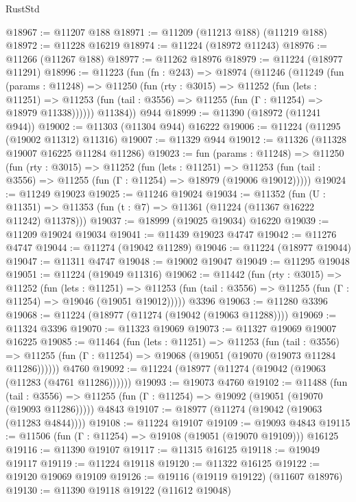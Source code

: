 \begin{lexlean}{RustStd}
\begin{coremodule}
@18967 := @11207 @188
@18971 := @11209 (@11213 @188) (@11219 @188)
@18972 := @11228 @16219
@18974 := @11224 (@18972 @11243)
@18976 := @11266 (@11267 @188)
@18977 := @11262 @18976
@18979 := @11224 (@18977 @11291)
@18996 := @11223
    (fun (fn : @243) =>
    @18974
      (@11246
        (@11249
          (fun (params : @11248) =>
          @11250
            (fun (rty : @3015) =>
            @11252
              (fun (lets : @11251) =>
              @11253 (fun (tail : @3556) => @11255 (fun (Γ : @11254) => @18979 @11338))))))
        @11384))
    @944
@18999 := @11390 (@18972 (@11241 @944))
@19002 := @11303 (@11304 @944) @16222
@19006 := @11224 (@11295 (@19002 @11312) @11316)
@19007 := @11329 @944
@19012 := @11326 (@11328 @19007 @16225 @11284 @11286)
@19023 := fun (params : @11248) =>
  @11250
    (fun (rty : @3015) =>
    @11252
      (fun (lets : @11251) =>
      @11253 (fun (tail : @3556) => @11255 (fun (Γ : @11254) => @18979 (@19006 @19012)))))
@19024 := @11249 @19023
@19025 := @11246 @19024
@19034 := @11352
    (fun (U : @11351) => @11353 (fun (t : @7) => @11361 (@11224 (@11367 @16222 @11242) @11378)))
@19037 := @18999 (@19025 @19034) @16220
@19039 := @11209 @19024 @19034
@19041 := @11439 @19023 @4747
@19042 := @11276 @4747
@19044 := @11274 (@19042 @11289)
@19046 := @11224 (@18977 @19044)
@19047 := @11311 @4747
@19048 := @19002 @19047
@19049 := @11295 @19048
@19051 := @11224 (@19049 @11316)
@19062 := @11442
    (fun (rty : @3015) =>
    @11252
      (fun (lets : @11251) =>
      @11253 (fun (tail : @3556) => @11255 (fun (Γ : @11254) => @19046 (@19051 @19012)))))
    @3396
@19063 := @11280 @3396
@19068 := @11224 (@18977 (@11274 (@19042 (@19063 @11288))))
@19069 := @11324 @3396
@19070 := @11323 @19069
@19073 := @11327 @19069 @19007 @16225
@19085 := @11464
    (fun (lets : @11251) =>
    @11253
      (fun (tail : @3556) =>
      @11255 (fun (Γ : @11254) => @19068 (@19051 (@19070 (@19073 @11284 @11286))))))
    @4760
@19092 := @11224 (@18977 (@11274 (@19042 (@19063 (@11283 (@4761 @11286))))))
@19093 := @19073 @4760
@19102 := @11488
    (fun (tail : @3556) => @11255 (fun (Γ : @11254) => @19092 (@19051 (@19070 (@19093 @11286)))))
    @4843
@19107 := @18977 (@11274 (@19042 (@19063 (@11283 @4844))))
@19108 := @11224 @19107
@19109 := @19093 @4843
@19115 := @11506 (fun (Γ : @11254) => @19108 (@19051 (@19070 @19109))) @16125
@19116 := @11390 @19107
@19117 := @11315 @16125
@19118 := @19049 @19117
@19119 := @11224 @19118
@19120 := @11322 @16125
@19122 := @19120 @19069 @19109
@19126 := @19116 (@19119 @19122) (@11607 @18976)
@19130 := @11390 @19118 @19122 (@11612 @19048)

\end{coremodule}
\end{lexlean}
